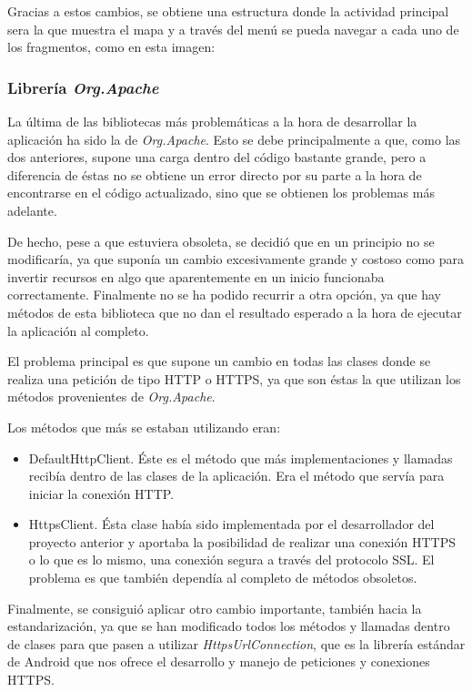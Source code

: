 Gracias a estos cambios, se obtiene una estructura donde la actividad principal sera la que muestra el mapa y a través del menú se pueda navegar a cada uno de los fragmentos, como en esta imagen:


\subsubsection{Librería \textit{Org.Apache}}

La última de las bibliotecas más problemáticas a la hora de desarrollar la aplicación ha sido la de \textit{Org.Apache}. Esto se debe principalmente a que, como las dos anteriores, supone una carga dentro del código bastante grande, pero a diferencia de éstas no se obtiene un error directo por su parte a la hora de encontrarse en el código actualizado, sino que se obtienen los problemas más adelante.

De hecho, pese a que estuviera obsoleta, se decidió que en un principio no se modificaría, ya que suponía un cambio excesivamente grande y costoso como para invertir recursos en algo que aparentemente en un inicio funcionaba correctamente. Finalmente no se ha podido recurrir a otra opción, ya que hay métodos de esta biblioteca que no dan el resultado esperado a la hora de ejecutar la aplicación al completo.

El problema principal es que supone un cambio en todas las clases donde se realiza una petición de tipo HTTP o HTTPS, ya que son éstas la que utilizan los métodos provenientes de \textit{Org.Apache}. 

Los métodos que más se estaban utilizando eran:

\begin{itemize}
\item DefaultHttpClient. Éste es el método que más implementaciones y llamadas recibía dentro de las clases de la aplicación. Era el método que servía para iniciar la conexión HTTP.
\item HttpsClient. Ésta clase había sido implementada por el desarrollador del proyecto anterior \cite{tfm1} y aportaba la posibilidad de realizar una conexión HTTPS o lo que es lo mismo, una conexión segura a través del protocolo SSL. El problema es que también dependía al completo de métodos obsoletos.
\end{itemize}

Finalmente, se consiguió aplicar otro cambio importante, también hacia la estandarización, ya que se han modificado todos los métodos y llamadas dentro de clases para que pasen a utilizar \textit{HttpsUrlConnection}, que es la librería estándar de Android que nos ofrece el desarrollo y manejo de peticiones y conexiones HTTPS.

